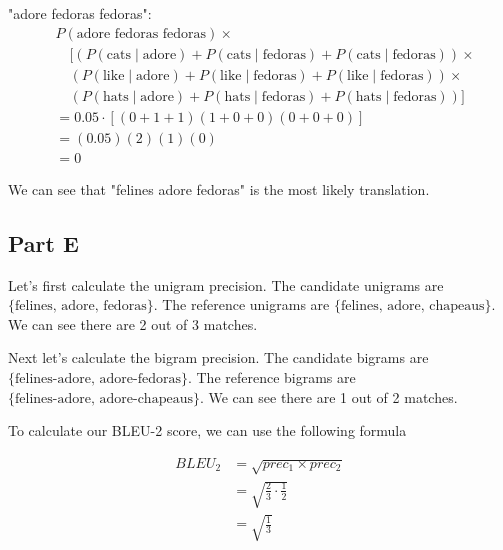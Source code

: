 \documentclass[a4 paper]{article}
\numberwithin{equation}{section}
\newcommand{\0}{\mathbf{0}}
\begin{document}
"adore fedoras fedoras":
\begin{align*}
    &P(\text{adore fedoras fedoras}) \times \\
    &\quad \Big[ 
        \left( P(\text{cats} \mid \text{adore}) + P(\text{cats} \mid \text{fedoras}) + P(\text{cats} \mid \text{fedoras}) \right) \times \\
    &\quad \left( P(\text{like} \mid \text{adore}) + P(\text{like} \mid \text{fedoras}) + P(\text{like} \mid \text{fedoras}) \right) \times \\
    &\quad \left( P(\text{hats} \mid \text{adore}) + P(\text{hats} \mid \text{fedoras}) + P(\text{hats} \mid \text{fedoras}) \right) 
    \Big] \\
    &= 0.05 \cdot \left[ (0 + 1 + 1)(1 + 0 + 0)(0 + 0 + 0) \right] \\
    &= (0.05)(2)(1)(0) \\
    &= 0
\end{align*}

We can see that "felines adore fedoras" is the most likely translation.

\subsection*{Part E}

Let's first calculate the unigram precision. The candidate unigrams are $\{ \text{felines, adore, fedoras} \}$. The reference unigrams are $\{ \text{felines, adore, chapeaus} \}$. We can see there are 2 out of 3 matches.

Next let's calculate the bigram precision. The candidate bigrams are $\{ \text{felines-adore, adore-fedoras} \}$. The reference bigrams are $\{ \text{felines-adore, adore-chapeaus} \}$. We can see there are 1 out of 2 matches.

To calculate our BLEU-2 score, we can use the following formula

\begin{align*}
    BLEU_2 &= \sqrt{prec_1 \times prec_2} \\
    &= \sqrt{\frac{2}{3} \cdot\frac{1}{2}} \\
    &= \boxed{\sqrt{\frac{1}{3}}}
\end{align*}
\end{document}
